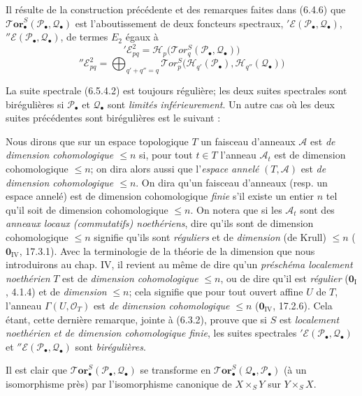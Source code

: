 \begin{env}[6.5.4]
Il résulte de la construction précédente et des remarques faites dans (6.4.6)
que $\boldsymbol{\mathscr{T}\!or}_\bullet^S(\mathscr P_\bullet,\mathscr Q_\bullet)$ est
l'aboutissement de deux foncteurs spectraux,
$'\mathscr E(\mathscr P_\bullet,\mathscr Q_\bullet)$,
$''\mathscr E(\mathscr P_\bullet,\mathscr Q_\bullet)$, de termes $E_2$ égaux à
\[
  '\mathscr E_{pq}^2
  =\mathscr H_p\bigl(\mathscr{T}\!or_q^S
    (\mathscr P_\bullet,\mathscr Q_\bullet)\bigr)
  \tag{6.5.4.1}\label{III.6.5.4.1.fr}
\]
\[
  ''\mathscr E_{pq}^2
  =\bigoplus_{q'+q''=q}
   \mathscr{T}\!or_p^S
   \bigl(\mathscr H_{q'}(\mathscr P_\bullet),
         \mathscr H_{q''}(\mathscr Q_\bullet)\bigr)
  \tag{6.5.4.2}\label{III.6.5.4.2.fr}
\]

La suite spectrale (6.5.4.2) est toujours régulière; les deux suites spectrales
sont birégulières si $\mathscr P_\bullet$ et $\mathscr Q_\bullet$ sont \emph{limités
inférieurement}. Un autre cas où les deux suites précédentes sont birégulières
est le suivant :
\end{env}

\begin{env}[6.5.5]
Nous dirons que sur un espace topologique $T$ un faisceau d'anneaux
$\mathscr A$ est \emph{de dimension cohomologique $\leqslant n$} si, pour tout
$t\in T$ l'anneau $\mathscr A_t$ est de dimension cohomologique $\leqslant n$;
on dira alors aussi que l'\emph{espace annelé} $(T,\mathscr A)$ est
\emph{de dimension cohomologique $\leqslant n$}. On dira qu'un faisceau
d'anneaux (resp. un espace annelé) est de dimension cohomologique \emph{finie}
s'il existe un entier $n$ tel qu'il soit de dimension cohomologique
$\leqslant n$. On notera que si les $\mathscr A_t$ sont des \emph{anneaux locaux
(commutatifs) noethériens},
dire qu'ils sont de dimension cohomologique $\leqslant n$ signifie qu'ils sont
\emph{réguliers} et de \emph{dimension} (de Krull) $\leqslant n$ ($\mathbf{0}_{\mathrm{IV}}$, 17.3.1).
Avec la terminologie de la théorie de la dimension que nous introduirons au
chap. IV, il revient au même de dire qu'un \emph{préschéma localement noethérien} $T$
est de \emph{dimension cohomologique} $\leqslant n$, ou de dire qu'il est \emph{régulier}
($\mathbf{0}_{\mathrm I}$, 4.1.4) et de \emph{dimension} $\leqslant n$; cela signifie que pour
tout ouvert affine $U$ de $T$, l'anneau $\Gamma(U,\mathscr O_T)$ est \emph{de
dimension cohomologique} $\leqslant n$ ($\mathbf{0}_{\mathrm{IV}}$, 17.2.6). Cela étant,
cette dernière remarque, jointe à (6.3.2), prouve que si $S$ est \emph{localement
noethérien et de dimension cohomologique finie}, les suites spectrales
$'\mathscr E(\mathscr P_\bullet,\mathscr Q_\bullet)$ et
$''\mathscr E(\mathscr P_\bullet,\mathscr Q_\bullet)$ sont \emph{birégulières}.

Il est clair que
$\boldsymbol{\mathscr{T}\!or}_\bullet^S(\mathscr P_\bullet,\mathscr Q_\bullet)$ se
transforme en
$\boldsymbol{\mathscr{T}\!or}_\bullet^S(\mathscr Q_\bullet,\mathscr P_\bullet)$ (à un
isomorphisme près) par l'isomorphisme canonique de $X\times_S Y$ sur
$Y\times_S X$.
\end{env}

